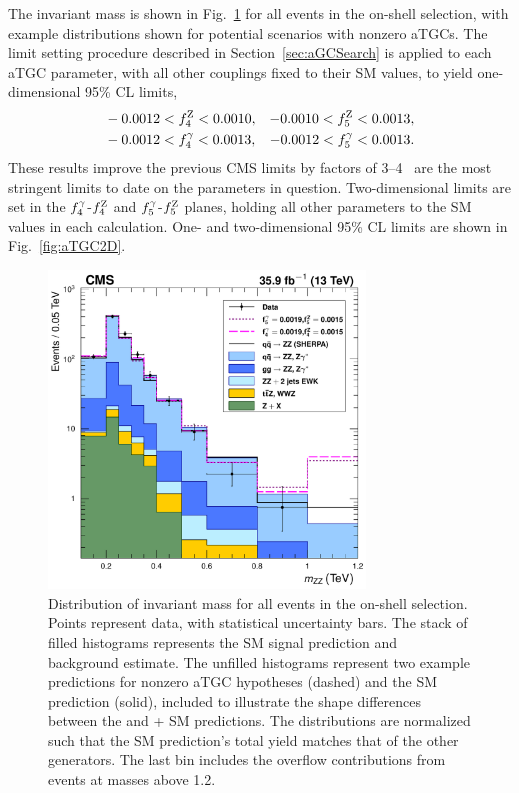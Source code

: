 The {\ZZ} invariant mass is shown in Fig.~\ref{fig:aTGC} for all events in the on-shell selection, with example distributions shown for potential scenarios with nonzero aTGCs.
The limit setting procedure described in Section~\ref{sec:aGCSearch} is applied to each aTGC parameter, with all other couplings fixed to their SM values, to yield one-dimensional 95\% CL limits,
\begin{equation}\label{eq:aTGC1D}
  \begin{aligned}
  & -0.0012 < f_4^\mathrm{Z} < 0.0010   ,  & -0.0010 < f_5^\mathrm{Z} < 0.0013 , \\
  & -0.0012 < f_4^\mathrm{\gamma} < 0.0013   ,  & -0.0012 < f_5^\mathrm{\gamma} < 0.0013 .
  \end{aligned}
\end{equation}
These results improve the previous CMS limits by factors of 3--4~\cite{CMS:2014xja} are the most stringent limits to date on the parameters in question.
Two-dimensional limits are set in the $f_4^\mathrm{\gamma}$-$f_4^\mathrm{Z}$ and $f_5^\mathrm{\gamma}$-$f_5^\mathrm{Z}$ planes, holding all other parameters to the SM values in each calculation.
One- and two-dimensional 95\% CL limits are shown in Fig.~\ref{fig:aTGC2D}.


\begin{figure}[htbp]
  \begin{center}
    \includegraphics[width=0.75\textwidth]{results/zzMass_aTGC.pdf}
    \caption[{\ZZ} invariant mass distribution with example aTGC working points]{
        Distribution of {\ZZ} invariant mass for all events in the on-shell selection.
        Points represent data, with statistical uncertainty bars.
        The stack of filled histograms represents the SM signal prediction and background estimate.
        The unfilled histograms represent two example {\SHERPA} predictions for nonzero aTGC hypotheses (dashed) and the {\SHERPA} SM prediction (solid), included to illustrate the shape differences between the {\SHERPA} and {\POWHEG}+{\MCFM} SM predictions.
        The {\SHERPA} distributions are normalized such that the SM prediction's total yield matches that of the other generators.
        The last bin includes the overflow contributions from events at masses above {1.2\TeV}.
      }\label{fig:aTGC}
  \end{center}
\end{figure}

